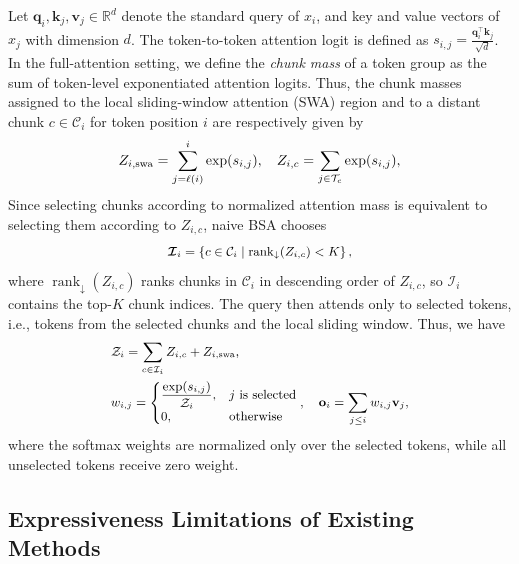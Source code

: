 Let $\mathbf{q}_i, \mathbf{k}_j, \mathbf{v}_j \in \mathbb{R}^d$ denote the standard query of $x_i$, and key and value vectors of $x_j$ with dimension $d$. The token-to-token attention logit is defined as $s_{i,j} = \frac{\mathbf{q}_i^\top \mathbf{k}_j}{\sqrt{d}}$. In the full-attention setting, 
we define the \textit{chunk mass} of a token group as the sum of token-level exponentiated attention logits. 
Thus, the chunk masses assigned to the local sliding-window attention (SWA)  region and to a distant chunk $c \in \mathcal{C}_i$ for token position $i$ are respectively given by
\begin{equation}
\small
\label{eqn:z_bsa}
 Z_{i, \text{swa}} = \sum_{j=\ell(i)}^{i} \exp(s_{i,j}), \quad 
     Z_{i,c} = \sum_{j\in\mathcal{T}_c} \exp(s_{i,j}),
\end{equation}
Since selecting chunks according to normalized attention mass is equivalent to selecting them according to $Z_{i,c}$, naive BSA chooses
\begin{equation}
\small
\label{eq:naive_bsa_select}
    \bm{\mathcal{I}}_i
    =
    \left\{
    c \in \mathcal{C}_i
    \mid
    \operatorname{rank}_{\downarrow}(
    Z_{i,c} 
    ) < K
    \right\},
\end{equation}
where $\operatorname{rank}_{\downarrow}(Z_{i,c})$ ranks chunks in $\mathcal{C}_i$ in descending order of $Z_{i,c}$, so $\bm{\mathcal{I}}_i$ contains the top-$K$ chunk indices.
The query then attends only to selected tokens, i.e., tokens from the selected chunks and the local sliding window. Thus, we have
\begin{equation}
\small
\label{eq:naive_bsa_weight}
\begin{aligned}
    &\mathcal{Z}_i =
    \sum_{c \in \mathcal{I}_i} Z_{i,c}
    +
    Z_{i,\mathrm{swa}}, \\
    &w_{i,j} =
    \begin{cases}
    \displaystyle
    \frac{\exp(s_{i,j})}{\mathcal{Z}_i},
    & j \text{ is selected} \\
    0,
    & \text{otherwise}
    \end{cases},\quad \mathbf{o}_{i} = \sum_{j \le i} w_{i,j} \mathbf{v}_j,
\end{aligned}
\end{equation}
where the softmax weights are normalized only over the selected tokens, while all unselected tokens receive zero weight.

\subsection{Expressiveness Limitations of Existing Methods}
\label{sec:exp_limit}

